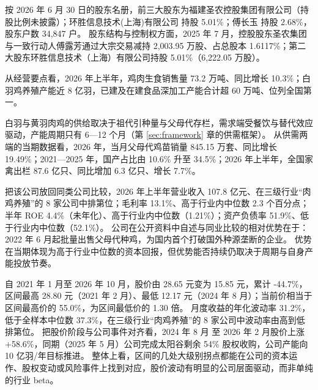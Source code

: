  按 2026 年 6 月 30 日的股东名册，前三大股东为福建圣农控股集团有限公司（持股比例未披露）；环胜信息技术(上海)有限公司 持股 5.01\%；傅长玉 持股 2.68\%，股东户数 34,847 户。 股东结构与控制权方面，2025 年 7 月，控股股东圣农集团与一致行动人傅露芳通过大宗交易减持 2,003.95 万股、占总股本 1.6117\%；第二大股东环胜信息技术（上海）有限公司持股 5.01\%（6,222.05 万股）。

 从经营要点看，2026 年上半年，鸡肉生食销售量 73.2 万吨、同比增长 10.3\%；白羽鸡养殖产能近 8 亿羽，已建及在建食品深加工产能合计超 60 万吨、位列全国第一。

 白羽与黄羽肉鸡的供给取决于祖代引种量与父母代存栏，需求端受餐饮与替代效应驱动，产能周期只有 6---12 个月（第 \ref{sec:framework} 章的供需框架）。 从供需两端的当期数据看，2026 年，当月父母代鸡苗销量 845.15 万套、同比增长 19.49\%；2021---2025 年，国产占比由 10.6\% 升至 34.5\%；2026 年上半年，全国家禽出栏 87.6 亿只、同比增加 6.3 亿只、增长 7.7\%。

 把该公司放回同类公司比较，2026 年上半年营业收入 107.8 亿元、在三级行业“肉鸡养殖”的 8 家公司中排第位；毛利率 13.1\%、高于行业内中位数 2.3 个百分点；半年 ROE 4.4\%（未年化）、高于行业内中位数（1.21\%）；资产负债率 51.9\%、低于行业内中位数（52.1\%）。 公司在公开资料中自述与同业比较的相对优势在于：2022 年 6 月起批量出售父母代种鸡，为国内首个打破国外种源垄断的企业。 优势在当期体现为高于行业中位数的资本回报，但优势能否持续仍取决于周期与自身产能投放节奏。

 自 2021 年 1 月至 2026 年 10 月，股价由 28.65 元变为 15.85 元，累计 -44.7\%，区间最高 28.80 元（2021 年 2 月）、最低 12.17 元（2024 年 8 月）；当前价相当于区间最高价的 55.0\%，为区间最低价的 1.30 倍。 月度收益的年化波动率 31.2\%，低于全样本中位数 37.3\%，在三级行业“肉鸡养殖”的 8 家公司中波动率由高到低排第位。 把股价阶段与公司事件对齐看，2024 年 8 月 至 2026 年 2 月股价上涨+58.6\%，同期（2025 年 5 月）公司完成太阳谷剩余 54\% 股权收购，公司产能向 10 亿羽/年目标推进。 整体上看，区间的几处大级别拐点都能在公司的资本运作、股权变动或风险事件上找到对应，股价波动有明显的公司层面驱动，而非单纯的行业 beta。

